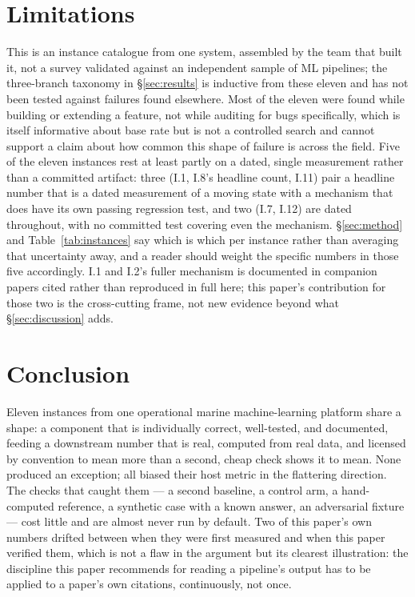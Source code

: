 \section{Limitations}
\label{sec:limitations}

This is an instance catalogue from one system, assembled by the team that
built it, not a survey validated against an independent sample of ML
pipelines; the three-branch taxonomy in \S\ref{sec:results} is inductive
from these eleven and has not been tested against failures found elsewhere.
Most of the eleven were found while building or extending a feature, not
while auditing for bugs specifically, which is itself informative about base
rate but is not a controlled search and cannot support a claim about how
common this shape of failure is across the field. Five of the eleven
instances rest at least partly on a dated, single measurement rather than a
committed artifact: three (I.1, I.8's headline count, I.11) pair a headline
number that is a dated measurement of a moving state with a mechanism that
does have its own passing regression test, and two (I.7, I.12) are dated
throughout, with no committed test covering even the mechanism.
\S\ref{sec:method} and
Table~\ref{tab:instances} say which is which per instance rather than
averaging that uncertainty away, and a reader should weight the specific
numbers in those five accordingly. I.1 and I.2's fuller mechanism is documented in
companion papers cited rather than reproduced in full here; this paper's
contribution for those two is the cross-cutting frame, not new evidence
beyond what \S\ref{sec:discussion} adds.

\section{Conclusion}

Eleven instances from one operational marine machine-learning platform share
a shape: a component that is individually correct, well-tested, and
documented, feeding a downstream number that is real, computed from real
data, and licensed by convention to mean more than a second, cheap check
shows it to mean. None produced an exception; all biased their host metric
in the flattering direction. The checks that caught them --- a second
baseline, a control arm, a hand-computed reference, a synthetic case with a
known answer, an adversarial fixture --- cost little and are almost never
run by default. Two of this paper's own numbers drifted between when they
were first measured and when this paper verified them, which is not a flaw
in the argument but its clearest illustration: the discipline this paper
recommends for reading a pipeline's output has to be applied to a paper's
own citations, continuously, not once.
